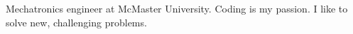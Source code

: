 
\begin{cvparagraph}

Mechatronics engineer at McMaster University. \newline
Coding is my passion. \newline
I like to solve new, challenging problems. \newline
\end{cvparagraph}
